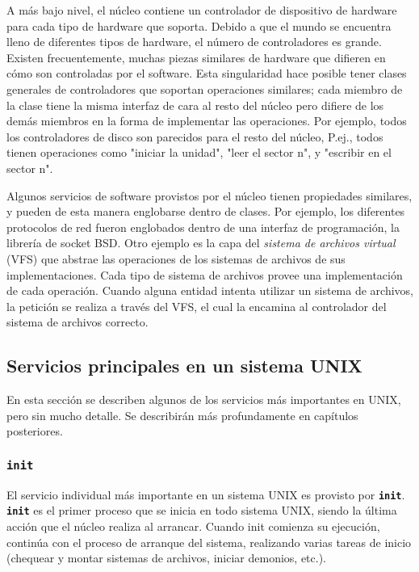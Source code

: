 A más bajo nivel, el núcleo contiene un controlador de dispositivo de
hardware para cada tipo de hardware que soporta. Debido a que el mundo se
encuentra lleno de diferentes tipos de hardware, el número de controladores es
grande. Existen frecuentemente, muchas piezas similares de hardware que difieren
en cómo son controladas por el software. Esta singularidad hace posible tener
clases generales de controladores que soportan operaciones similares; cada
miembro de la clase tiene la misma interfaz de cara al resto del núcleo pero
difiere de los demás miembros en la forma de implementar las operaciones. Por
ejemplo, todos los controladores de disco son parecidos para el resto del
núcleo, P.ej., todos tienen operaciones como "iniciar la unidad", "leer el
sector n", y "escribir en el sector n".

 Algunos servicios de software provistos por el núcleo tienen propiedades
similares, y pueden de esta manera englobarse dentro de clases. Por ejemplo, los
diferentes protocolos de red fueron englobados dentro de una interfaz de
programación, la librería de socket BSD. Otro ejemplo es la capa del
\textit{sistema de archivos virtual} (VFS) que abstrae las
operaciones de los sistemas de archivos de sus implementaciones. Cada tipo de
sistema de archivos provee una implementación de cada operación. Cuando alguna
entidad intenta utilizar un sistema de archivos, la petición se realiza a través
del VFS, el cual la encamina al controlador del sistema de archivos correcto.




\subsection{Servicios principales en un sistema UNIX}

 En esta sección se describen algunos de los servicios más importantes en
UNIX, pero sin mucho detalle. Se describirán más profundamente en capítulos
posteriores.  


\subsubsection{\texttt{\textbf{init}}}

 El servicio individual más importante en un sistema UNIX es provisto por
\texttt{\textbf{init}}. \texttt{\textbf{init}} es el primer proceso que se
inicia en todo sistema UNIX, siendo la última acción que el núcleo realiza al
arrancar.  Cuando init comienza su ejecución, continúa con el proceso de
arranque del sistema, realizando varias tareas de inicio (chequear y montar
sistemas de archivos, iniciar demonios, etc.).  


